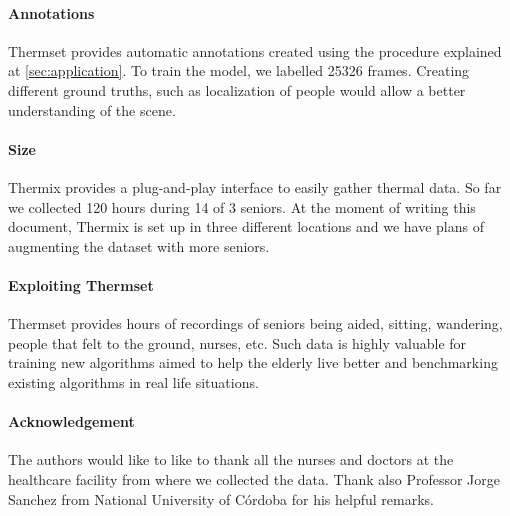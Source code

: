 \documentclass[oneside, twocolumn]{article}
\newcommand\TotalHoursOfRecording{120}
\newcommand\TotalNumbersOfDays{14}
\newcommand\NumberOfPeople{3}
\begin{document}
\paragraph{Annotations}
Thermset provides automatic annotations created using the procedure explained at \autoref{sec:application}.
To train the model, we labelled 25326 frames. Creating different ground truths, such as localization of
people would allow a better understanding of the scene.
\paragraph{Size}
Thermix provides a plug-and-play interface to easily gather thermal data. So far we collected \TotalHoursOfRecording{}
hours during \TotalNumbersOfDays{} of \NumberOfPeople{} seniors. At the moment of writing this document, Thermix is set up in
three different locations and we have plans of augmenting the dataset with more seniors.

\paragraph{Exploiting Thermset}
Thermset provides hours of recordings of seniors being aided, sitting, wandering, people that felt to the
ground, nurses, etc. Such data is highly valuable for training new algorithms aimed to help the elderly live
better and benchmarking existing algorithms in real life situations.
\paragraph{Acknowledgement}
The authors would like to like to thank all the nurses and doctors at the healthcare facility from where we
collected the data. Thank also Professor Jorge Sanchez from National University of C\'ordoba for his helpful remarks.

\end{document}
